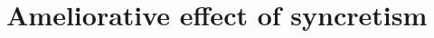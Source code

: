\documentclass[output=paper,colorlinks,citecolor=brown,
]{langscibook}
\begin{document}





\section{Ameliorative effect of \sti syncretism}



\end{document}

